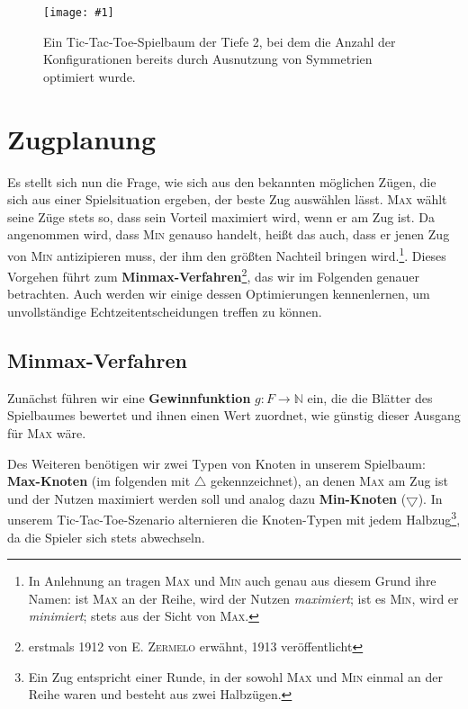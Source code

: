 \documentclass[a4paper,twoside]{scrartcl}
\newcommand\g[4]{%
  \begin{figure}[!ht]
  \centering
  \texttt{[image: \#1]}
  \caption{#3\label{fig:#2}}
  \end{figure}}
\begin{document}
\g{tic.pdf}{tictactoe}{Ein Tic-Tac-Toe-Spielbaum der Tiefe 2, bei dem die Anzahl der Konfigurationen bereits durch Ausnutzung von Symmetrien optimiert wurde.}{.9}

\section{Zugplanung}

Es stellt sich nun die Frage, wie sich aus den bekannten möglichen Zügen, die sich aus einer Spielsituation ergeben, der beste Zug auswählen lässt. \textsc{Max} wählt seine Züge stets so, dass sein Vorteil maximiert wird, wenn er am Zug ist. Da angenommen wird, dass \textsc{Min} genauso handelt, heißt das auch, dass er jenen Zug von \textsc{Min} antizipieren muss, der ihm den größten Nachteil bringen wird.\footnote{In Anlehnung an \cite{russel:2012} tragen \textsc{Max} und \textsc{Min} auch genau aus diesem Grund ihre Namen: ist \textsc{Max} an der Reihe, wird der Nutzen \textit{maximiert}; ist es \textsc{Min}, wird er \textit{minimiert}; stets aus der Sicht von \textsc{Max}.}. Dieses Vorgehen führt zum \textbf{Minmax-Verfahren}\footnote{erstmals 1912 von \textsc{E. Zermelo} erwähnt, 1913 veröffentlicht\cite{zermelo:1913}}, das wir im Folgenden genauer betrachten. Auch werden wir einige dessen Optimierungen kennenlernen, um unvollständige Echtzeitentscheidungen treffen zu können.


\subsection{Minmax-Verfahren}

Zunächst führen wir eine \textbf{Gewinnfunktion} $g: F \to \mathbb{N}$ ein, die die Blätter des Spielbaumes bewertet und ihnen einen Wert zuordnet, wie günstig dieser Ausgang für \textsc{Max} wäre.

Des Weiteren benötigen wir zwei Typen von Knoten in unserem Spielbaum: \textbf{Max-Knoten} (im folgenden mit $\bigtriangleup$ gekennzeichnet), an denen \textsc{Max} am Zug ist und der Nutzen maximiert werden soll und analog dazu \textbf{Min-Knoten} ($\bigtriangledown$). In unserem Tic-Tac-Toe-Szenario alternieren die Knoten-Typen mit jedem Halbzug\footnote{Ein Zug entspricht einer Runde, in der sowohl \textsc{Max} und \textsc{Min} einmal an der Reihe waren und besteht aus zwei Halbzügen.}, da die Spieler sich stets abwechseln. 
\end{document}

